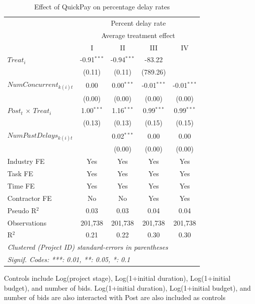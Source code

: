 \documentclass[
]{article}
\begin{document}
\begin{table}[htbp]
   \caption{Effect of QuickPay on percentage delay rates}
   \centering
   \small
   \begin{tabular}{lcccc}
      \toprule
       & \multicolumn{4}{c}{Percent delay rate}\\
       & \multicolumn{4}{c}{Average treatment effect} \\ 
                                   & I             & II            & III           & IV\\  
      \midrule 
      $Treat_i$                    & -0.91$^{***}$ & -0.94$^{***}$ & -83.22        &   \\   
                                   & (0.11)        & (0.11)        & (789.26)      &   \\   
      $NumConcurrent_{k(i)t}$      & 0.00          & 0.00$^{***}$  & -0.01$^{***}$ & -0.01$^{***}$\\   
                                   & (0.00)        & (0.00)        & (0.00)        & (0.00)\\   
      $Post_t$ $\times$ $Treat_i$  & 1.00$^{***}$  & 1.16$^{***}$  & 0.99$^{***}$  & 0.99$^{***}$\\   
                                   & (0.13)        & (0.13)        & (0.15)        & (0.15)\\   
      $NumPastDelays_{k(i)t}$      &               & 0.02$^{***}$  & 0.00          & 0.00\\   
                                   &               & (0.00)        & (0.00)        & (0.00)\\   
      \midrule 
      Industry FE                  & Yes           & Yes           & Yes           & Yes\\  
      Task FE                      & Yes           & Yes           & Yes           & Yes\\  
      Time FE                      & Yes           & Yes           & Yes           & Yes\\  
      Contractor FE                & No            & No            & Yes           & Yes\\  
      Pseudo R$^2$                 & 0.03          & 0.03          & 0.04          & 0.04\\  
      Observations                 & 201,738       & 201,738       & 201,738       & 201,738\\  
      R$^2$                        & 0.21          & 0.22          & 0.30          & 0.30\\  
      \midrule
      \multicolumn{5}{l}{\emph{Clustered (Project ID) standard-errors in parentheses}}\\
      \multicolumn{5}{l}{\emph{Signif. Codes: ***: 0.01, **: 0.05, *: 0.1}}\\
   \end{tabular}
   
   \par \raggedright 
   Controls include Log(project stage), Log(1+initial duration), Log(1+initial budget), and number of bids. Log(1+initial duration), Log(1+initial budget), and number of bids are also interacted with Post are also included as controls
\end{table}
\end{document}
